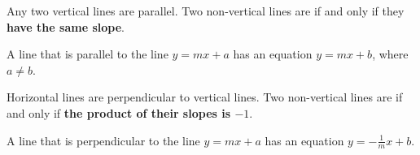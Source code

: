 \begin{tcolorbox}[colback=white,colframe=cyan, title filled=false, coltitle=cyan, enhanced, attach boxed title to top center={yshift=-3mm,yshifttext=-1mm}, fonttitle=\bfseries, boxed title style={size=small,colback=white}, before upper={\parindent15pt},
title={Perpendicular and parallel lines}]
\begin{multicols}{2}
Any two vertical lines are parallel. Two non-vertical lines are  if and only if they \textbf{have the same slope}. 

A line that is parallel to the line $y=mx+a$ has an equation $y=mx+b$, where $a\neq b$.


\columnbreak

Horizontal lines are perpendicular to vertical lines. Two non-vertical lines are  if and only if \textbf{the product of their slopes is $-1$}. 

A line that is perpendicular to the line $y=mx+a$ has an equation $y=-\frac1m x+b$.


\end{multicols}
\end{tcolorbox}


